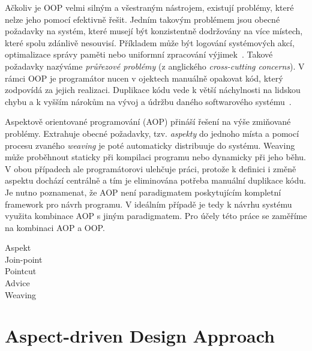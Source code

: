 Ačkoliv je \gls{OOP} velmi silným a všestraným nástrojem,
existují problémy, které nelze jeho pomocí efektivně řešit.
Jedním takovým problémem jsou obecné požadavky na systém,
které musejí být konzistentně dodržovány na více místech,
které spolu zdánlivě nesouvisí. Příkladem
může být logování systémových akcí, optimalizace správy paměti
nebo uniformní zpracování výjimek~\cite{kiczales1997aspect}.
Takové požadavky nazýváme \textit{průřezové problémy}
(z anglického \textit{cross-cutting concerns}).
V rámci \gls{OOP} je programátor nucen v ojektech manuálně opakovat
kód, který zodpovídá za jejich realizaci. Duplikace kódu
vede k větší náchylnosti na lidskou chybu a k vyšším nárokům na vývoj
a údržbu daného softwarového systému~\cite{fowler1999refactoring}.

Aspektově orientované programování (\gls{AOP}) přináší řešení na
výše zmiňované problémy. Extrahuje obecné požadavky,
tzv. \textit{aspekty} do jednoho místa a pomocí procesu zvaného
\textit{weaving} je poté automaticky distribuuje do systému.
Weaving může proběhnout staticky při kompilaci programu nebo dynamicky
při jeho běhu. V obou případech ale programátorovi ulehčuje práci,
protože k definici i změně aspektu dochází centrálně a tím je eliminována
potřeba manuální duplikace kódu. Je nutno poznamenat, že \gls{AOP} není
paradigmatem poskytujícím kompletní framework pro návrh programu.
V ideálním případě je tedy k návrhu systému využita kombinace
\gls{AOP} s jiným paradigmatem. Pro účely této práce se zaměříme na
kombinaci \gls{AOP} a \gls{OOP}.


\begin{description}
    \item [Aspekt]
    \item [Join-point]
    \item [Pointcut]
    \item [Advice]
    \item [Weaving]
\end{description}

\section{Aspect-driven Design Approach}

